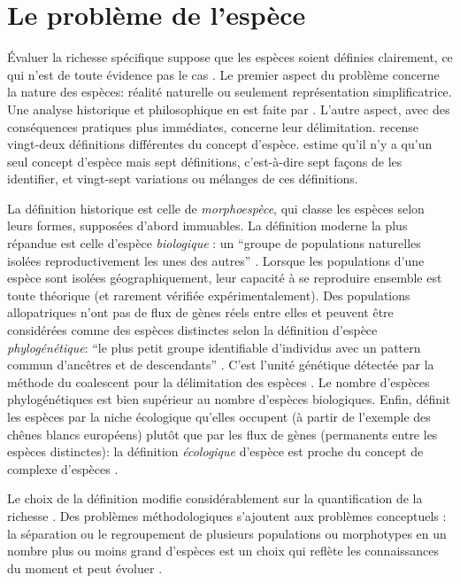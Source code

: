 \documentclass[
  11pt,
  american,
  a4paper,
  extrafontsizes,onecolumn,openright
  ]{memoir}
\begin{document}
\hypertarget{le-probluxe8me-de-lespuxe8ce}{%
\section{Le problème de l'espèce}\label{le-probluxe8me-de-lespuxe8ce}}

Évaluer la richesse spécifique suppose que les espèces soient définies clairement, ce qui n'est de toute évidence pas le cas \autocite{Casetta2014}.
Le premier aspect du problème concerne la nature des espèces: réalité naturelle ou seulement représentation simplificatrice.
Une analyse historique et philosophique en est faite par \textcite{Richards2010}.
L'autre aspect, avec des conséquences pratiques plus immédiates, concerne leur délimitation.
\textcite{Mayden1997} recense vingt-deux définitions différentes du concept d'espèce.
\textcite{Wilkins2011} estime qu'il n'y a qu'un seul concept d'espèce mais sept définitions, c'est-à-dire sept façons de les identifier, et vingt-sept variations ou mélanges de ces définitions.

La définition historique est celle de \emph{morphoespèce}, qui classe les espèces selon leurs formes, supposées d'abord immuables.
La définition moderne la plus répandue est celle d'espèce \emph{biologique} \autocite{Dobzhansky1937}: un \enquote{groupe de populations naturelles isolées reproductivement les unes des autres} \autocite{Mayr1942}.
Lorsque les populations d'une espèce sont isolées géographiquement, leur capacité à se reproduire ensemble est toute théorique (et rarement vérifiée expérimentalement).
Des populations allopatriques n'ont pas de flux de gènes réels entre elles et peuvent être considérées comme des espèces distinctes selon la définition d'espèce \emph{phylogénétique}: \enquote{le plus petit groupe identifiable d'individus avec un pattern commun d'ancêtres et de descendants} \autocite{Cracraft1983}.
C'est l'unité génétique détectée par la méthode du coalescent pour la délimitation des espèces \autocite{Sukumaran2017}.
Le nombre d'espèces phylogénétiques est bien supérieur au nombre d'espèces biologiques.
Enfin, \textcite{VanValen1976} définit les espèces par la niche écologique qu'elles occupent (à partir de l'exemple des chênes blancs européens) plutôt que par les flux de gènes (permanents entre les espèces distinctes): la définition \emph{écologique} d'espèce est proche du concept de complexe d'espèces \autocite[ensemble d'espèces voisines échangeant des gènes,][]{Pernes1984}.

Le choix de la définition modifie considérablement sur la quantification de la richesse \autocite{Agapow2004}.
Des problèmes méthodologiques s'ajoutent aux problèmes conceptuels \autocite{Hey2001}: la séparation ou le regroupement de plusieurs populations ou morphotypes en un nombre plus ou moins grand d'espèces est un choix qui reflète les connaissances du moment et peut évoluer \autocite{Barberousse2014}.
\end{document}
